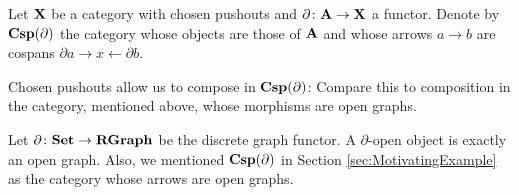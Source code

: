 \begin{df} 
	Let $ \mathbf{X} $ be a category with chosen pushouts and $ \partial \colon \mathbf{A} \to \mathbf{X} $ a functor. Denote by $ \mathbf{Csp}(\partial) $ the category whose objects are those of $ \mathbf{A} $ and whose arrows $ a \to b $ are cospans $ \partial a \to x \gets \partial b $.
\end{df}

Chosen pushouts allow us to compose in $ \mathbf{Csp}(\partial) $:
Compare this to composition in the category, mentioned above, whose morphisms are open graphs.

\begin{ex}
	Let $ \partial \colon \mathbf{Set} \to \mathbf{RGraph} $ be the discrete graph functor. A $ \partial $-open object is exactly an open graph.  Also, we mentioned $ \mathbf{Csp}(\partial) $ in Section \ref{sec:MotivatingExample} as the category whose arrows are open graphs.  
\end{ex}










